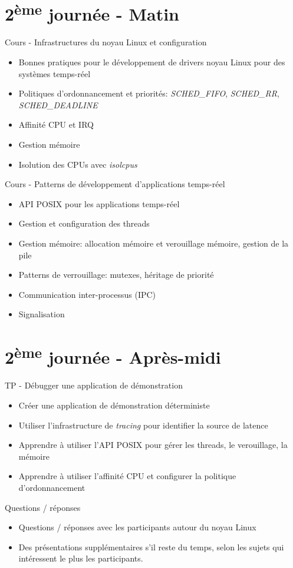 \documentclass[a4paper,12pt,obeyspaces,spaces,hyphens]{article}
\begin{document}
\section{2\textsuperscript{ème} journée - Matin}

\feagendaonecolumn
{Cours - Infrastructures du noyau Linux et configuration}
{
  \begin{itemize}
  \item Bonnes pratiques pour le développement de drivers noyau Linux
    pour des systèmes temps-réel
  \item Politiques d'ordonnancement et priorités: {\em SCHED\_FIFO},
    {\em SCHED\_RR}, {\em SCHED\_DEADLINE}
  \item Affinité CPU et IRQ
  \item Gestion mémoire
  \item Isolution des CPUs avec {\em isolcpus}
  \end{itemize}
}

\feagendaonecolumn
{Cours - Patterns de développement d'applications temps-réel}
{
  \begin{itemize}
  \item API POSIX pour les applications temps-réel
  \item Gestion et configuration des threads
  \item Gestion mémoire: allocation mémoire et verouillage mémoire, gestion de la pile
  \item Patterns de verrouillage: mutexes, héritage de priorité
  \item Communication inter-processus (IPC)
  \item Signalisation
  \end{itemize}
}

\section{2\textsuperscript{ème} journée - Après-midi}

\feagendaonecolumn
{TP - Débugger une application de démonstration}
{
  \begin{itemize}
  \item Créer une application de démonstration déterministe
  \item Utiliser l'infrastructure de {\em tracing} pour identifier la source de latence
  \item Apprendre à utiliser l'API POSIX pour gérer les threads, le verouillage, la mémoire
  \item Apprendre à utiliser l'affinité CPU et configurer la politique d'ordonnancement
  \end{itemize}
}

\feagendaonecolumn
{Questions / réponses}
{
  \begin{itemize}
  \item Questions / réponses avec les participants autour du noyau Linux
  \item Des présentations supplémentaires s'il reste du temps, selon les sujets
	qui intéressent le plus les participants.
  \end{itemize}
}
\end{document}
